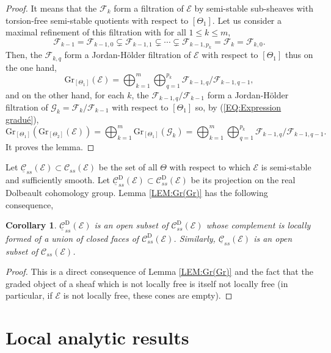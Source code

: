 \documentclass{article}
\newtheorem{corollary}[theorem]{Corollary}
\theoremstyle{remark}
\theoremstyle{definition}
\newcommand{\E}{\mathcal{E}}
\newcommand{\F}{\mathcal{F}}
\newcommand{\G}{\mathcal{G}}
\newcommand{\Gr}{\mathrm{Gr}}
\newcommand{\mC}{\mathcal{C}}
\renewcommand{\leq}{\leqslant}
\begin{document}
\begin{proof}
It means that the $\F_k$ form a filtration of $\E$ by semi-stable sub-sheaves with torsion-free semi-stable quotients with respect to $[\Theta_1]$. Let us consider a maximal refinement of this filtration with for all $1 \leq k \leq m$,
$$
\F_{k - 1} = \F_{k - 1,0} \subsetneq \F_{k - 1,1} \subsetneq \cdots \subsetneq \F_{k - 1,p_k} = \F_k = \F_{k,0}.
$$
Then, the $\F_{k,q}$ form a Jordan-Hölder filtration of $\E$ with respect to $[\Theta_1]$ thus on the one hand,
$$
\Gr_{[\Theta_1]}(\E) = \bigoplus_{k = 1}^m\bigoplus_{q = 1}^{p_k} \F_{k - 1,q}/\F_{k - 1,q - 1},
$$
and on the other hand, for each $k$, the $\F_{k - 1,q}/\F_{k - 1}$ form a Jordan-Hölder filtration of $\G_k = \F_k/\F_{k - 1}$ with respect to $[\Theta_1]$ so, by (\ref{EQ:Expression gradué}),
$$
\Gr_{[\Theta_1]}(\Gr_{[\Theta_2]}(\E)) = \bigoplus_{k = 1}^m \Gr_{[\Theta_1]}(\G_k) = \bigoplus_{k = 1}^m\bigoplus_{q = 1}^{p_k} \F_{k - 1,q}/\F_{k - 1,q - 1}.
$$
It proves the lemma.
\end{proof}
Let $\underline{\mC}_{ss}(\E) \subset \mC_{ss}(\E)$ be the set of all $\Theta$ with respect to which $\E$ is semi-stable and sufficiently smooth. Let $\underline{\mC}_{ss}^{\mathrm{D}}(\E) \subset \mC_{ss}^{\mathrm{D}}(\E)$ be its projection on the real Dolbeault cohomology group. Lemma \ref{LEM:Gr(Gr)} has the following consequence,
\begin{corollary}
    $\underline{\mC}_{ss}^{\mathrm{D}}(\E)$ is an open subset of $\mC_{ss}^{\mathrm{D}}(\E)$ whose complement is locally formed of a union of closed faces of $\mC_{ss}^{\mathrm{D}}(\E)$. Similarly, $\underline{\mC}_{ss}(\E)$ is an open subset of $\mC_{ss}(\E)$.
\end{corollary}
\begin{proof}
This is a direct consequence of Lemma \ref{LEM:Gr(Gr)} and the fact that the graded object of a sheaf which is not locally free is itself not locally free (in particular, if $\E$ is not locally free, these cones are empty).
\end{proof}

\section{Local analytic results}\label{SEC:Résulats analytiques}
\end{document}
